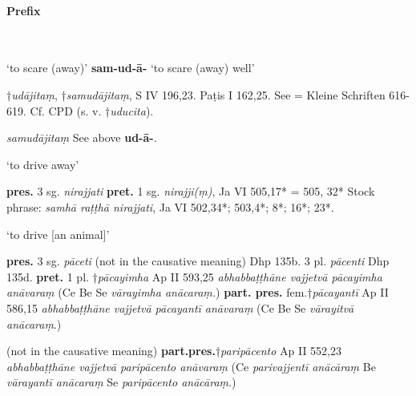 \documentclass[11pt]{article}
\newcommand*\ṛ{r\symbol{"325}}
\newcommand*\Ṛ{R\symbol{"325}}
\newcommand*\ṝ{r\symbol{"304}\symbol{"325}}
\newcommand*\Ṝ{R\symbol{"304}\symbol{"325}}
\newcommand*\ḷ{l\symbol{"325}}
\newcommand*\ḹ{l\symbol{"304}\symbol{"325}}
\newcommand*\Ḷ{L\symbol{"325}}
\newcommand*\Ḹ{L\symbol{"304}\symbol{"325}}
\begin{document}
\paragraph*{Prefix}\mbox{}\\
\begin{description}[leftmargin=\parindent]
\item[ud-ā-] `to scare (away)' \textbf{sam-ud-ā-} `to scare (away) well'
	\begin{description}[leftmargin=\parindent]
	\item[ppp.] †\textit{udājitaṃ}, †\textit{samudājitaṃ},  S IV 196,23. Paṭis I 162,25.
	See \citet{vonhinuber:1979} = Kleine Schriften 616-619. Cf. CPD (s. v. †\textit{uducita}).
	\end{description}

	\begin{description}[leftmargin=\parindent]
	\item[ppp.] \textit{samudājitaṃ}
	See above \textbf{ud-ā-}.
	\end{description} 
\item[nir-] `to drive away' 
	\begin{description}[leftmargin=\parindent]
	\item[Pass.] \textbf{pres.} 3 sg. \textit{nirajjati} \textbf{pret.} 1 sg. \textit{nirajji(ṃ)}, Ja VI 505,17* = 505, 32*
	Stock phrase: \textit{samhā raṭṭhā nirajjati}, Ja VI 502,34*; 503,4*; 8*; 16*; 23*.
	\end{description}
\item[pa-] `to drive [an animal]'
	\begin{description}[leftmargin=\parindent]
	\item[Caus.] \textbf{pres.} 3 sg. \textit{pāceti} (not in the causative meaning) Dhp 135b. 3 pl. \textit{pācenti} Dhp 135d.
	\textbf{pret.} 1 pl. †\textit{pācayimha} Ap II 593,25 \textit{abhabbaṭṭhāne vajjetvā pācayimha anāvaraṃ} (Ce Be Se \textit{vārayimha anācaraṃ.})
	\textbf{part. pres.} fem.†\textit{pācayantī} Ap II 586,15 \textit{abhabbaṭṭhāne vajjetvā pācayantī anāvaraṃ} (Ce Be Se \textit{vārayitvā anācaraṃ}.)
\item[pari-pa-]
	\item[Caus.] (not in the causative meaning) \textbf{part.pres.}†\textit{paripācento} Ap II 552,23
	\textit{abhabbaṭṭhāne vajjetvā paripācento anāvaraṃ} (Ce \textit{parivajjentī anācāraṃ} Be \textit{vārayantī anācaraṃ} Se \textit{paripācento anācāraṃ}.) 
	\end{description}


\end{description}
\end{document}
